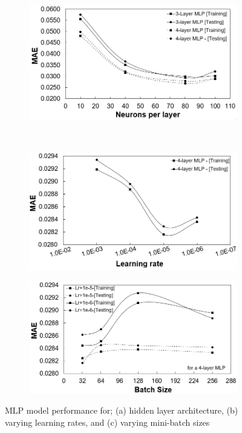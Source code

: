 \documentclass[a4paper,fleqn]{cas-sc}
\begin{document}
\begin{figure}[h!]
\centering
    \begin{subfigure}{0.5\textwidth}
    \includegraphics[width=1\textwidth]{NEURONS_HYPER}
    \caption{}
    \end{subfigure}\\
        \begin{subfigure}{0.5\textwidth}
    \includegraphics[width=1\textwidth]{LR_HYPER}
    \caption{}
    \end{subfigure}
        \begin{subfigure}{0.5\textwidth}
    \includegraphics[width=1\textwidth]{BATCH_SIZE_HYPER}
    \caption{}
    \end{subfigure}
    \caption{MLP model performance for; (a) hidden layer architecture, (b) varying learning rates, and (c) varying mini-batch sizes}\label{fig_mlp_hyper}
\end{figure}
\end{document}
